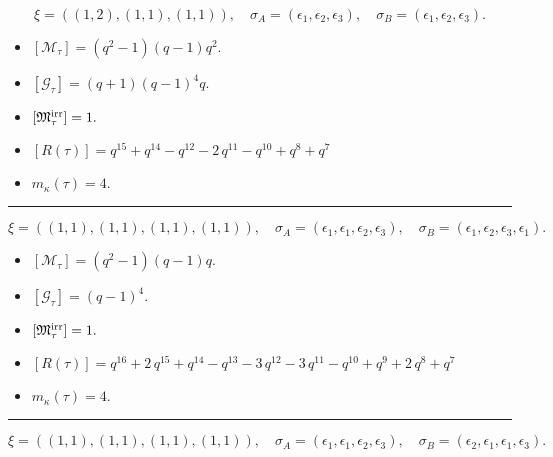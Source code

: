 \documentclass[10pt,a4paper]{amsart}
\begin{document}
$$\xi = ({(1, 2)}, {(1, 1)}, {(1, 1)}),\quad \sigma_A = ({{\epsilon_1}}, {{\epsilon_2}}, {{\epsilon_3}}),\quad \sigma_B = ({{\epsilon_1}}, {{\epsilon_2}}, {{\epsilon_3}}).$$

\begin{itemize}
 \item $[\mathcal{M}_{\tau}] = {\left(q^{2} - 1\right)} {\left(q - 1\right)} q^{2} .$

 \item $[\mathcal{G}_{\tau}] = {\left(q + 1\right)} {\left(q - 1\right)}^{4} q .$

 \item $[{\frak M}_{\tau}^{\textrm{irr}}] = 1 .$

 \item $[R(\tau)] = q^{15} + q^{14} - q^{12} - 2 \, q^{11} - q^{10} + q^{8} + q^{7} $

 \item $m_{\kappa}(\tau) = 4 .$

 \end{itemize}
\noindent\rule{8cm}{0.4pt}

$$\xi = ({(1, 1), (1, 1)}, {(1, 1)}, {(1, 1)}),\quad \sigma_A = ({{\epsilon_1}, {\epsilon_1}}, {{\epsilon_2}}, {{\epsilon_3}}),\quad \sigma_B = ({{\epsilon_1}, {\epsilon_2}}, {{\epsilon_3}}, {{\epsilon_1}}).$$

\begin{itemize}
 \item $[\mathcal{M}_{\tau}] = {\left(q^{2} - 1\right)} {\left(q - 1\right)} q .$

 \item $[\mathcal{G}_{\tau}] = {\left(q - 1\right)}^{4} .$

 \item $[{\frak M}_{\tau}^{\textrm{irr}}] = 1 .$

 \item $[R(\tau)] = q^{16} + 2 \, q^{15} + q^{14} - q^{13} - 3 \, q^{12} - 3 \, q^{11} - q^{10} + q^{9} + 2 \, q^{8} + q^{7} $

 \item $m_{\kappa}(\tau) = 4 .$

 \end{itemize}
\noindent\rule{8cm}{0.4pt}

$$\xi = ({(1, 1), (1, 1)}, {(1, 1)}, {(1, 1)}),\quad \sigma_A = ({{\epsilon_1}, {\epsilon_1}}, {{\epsilon_2}}, {{\epsilon_3}}),\quad \sigma_B = ({{\epsilon_2}, {\epsilon_1}}, {{\epsilon_1}}, {{\epsilon_3}}).$$
\end{document}
